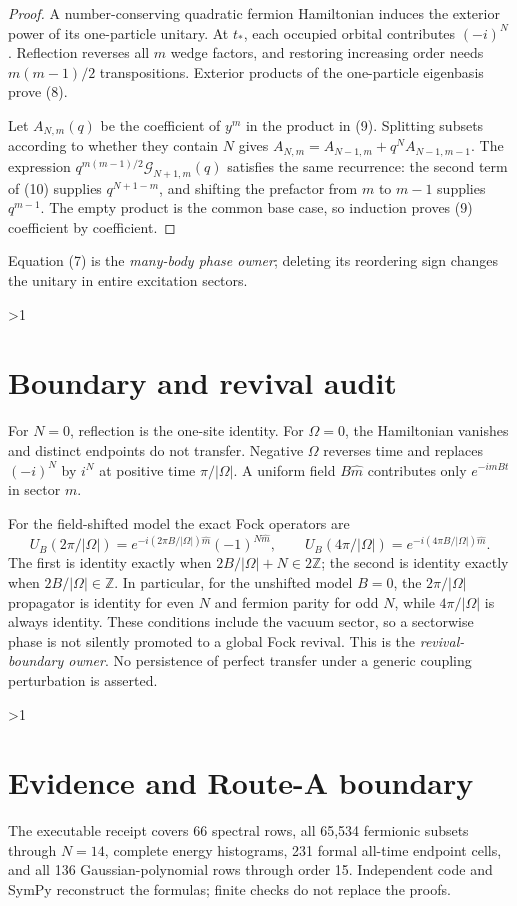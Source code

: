 \documentclass[10pt]{article}
\providecommand{\CRevisionRound}{2}
\begin{document}
\begin{proof}
A number-conserving quadratic fermion Hamiltonian induces the exterior power
of its one-particle unitary.  At \(t_*\), each occupied orbital contributes
\((-i)^N\).  Reflection reverses all \(m\) wedge factors, and restoring
increasing order needs \(m(m-1)/2\) transpositions.  Exterior products of the
one-particle eigenbasis prove (8).

Let $A_{N,m}(q)$ be the coefficient of $y^m$ in the product in (9).
Splitting subsets according to whether they contain $N$ gives
$A_{N,m}=A_{N-1,m}+q^N A_{N-1,m-1}$.  The expression
$q^{m(m-1)/2}\mathcal G_{N+1,m}(q)$ satisfies the same recurrence:
the second term of (10) supplies $q^{N+1-m}$, and shifting the prefactor from
$m$ to $m-1$ supplies $q^{m-1}$.  The empty product is the common base case,
so induction proves (9) coefficient by coefficient.
\end{proof}
Equation (7) is the \emph{many-body phase owner}; deleting its reordering sign
changes the unitary in entire excitation sectors.
\fi

\ifnum\CRevisionRound>1
\section{Boundary and revival audit}
For \(N=0\), reflection is the one-site identity.  For \(\Omega=0\), the
Hamiltonian vanishes and distinct endpoints do not transfer.  Negative
\(\Omega\) reverses time and replaces \((-i)^N\) by \(i^N\) at positive
time \(\pi/|\Omega|\).  A uniform field \(B\widehat m\) contributes only
\(e^{-imBt}\) in sector \(m\).

For the field-shifted model the exact Fock operators are
\[
 U_B(2\pi/|\Omega|)=
 e^{-i(2\pi B/|\Omega|)\widehat m}(-1)^{N\widehat m},\qquad
 U_B(4\pi/|\Omega|)=e^{-i(4\pi B/|\Omega|)\widehat m}.
\]
The first is identity exactly when $2B/|\Omega|+N\in2\mathbb Z$; the second
is identity exactly when $2B/|\Omega|\in\mathbb Z$.  In particular, for the
unshifted model $B=0$, the $2\pi/|\Omega|$ propagator is identity for even
$N$ and fermion parity for odd $N$, while $4\pi/|\Omega|$ is always identity.
These conditions include the vacuum sector, so a sectorwise phase is not
silently promoted to a global Fock revival.  This is the
\emph{revival-boundary owner}.  No persistence of perfect transfer under a
generic coupling perturbation is asserted.

\ifnum\CRevisionRound>1
\small
\fi
\section{Evidence and Route-A boundary}
The executable receipt covers 66 spectral rows, all 65,534 fermionic subsets
through \(N=14\), complete energy histograms, 231 formal all-time endpoint
cells, and all 136 Gaussian-polynomial rows through order 15.
Independent code and SymPy reconstruct the formulas; finite checks do not
replace the proofs.
\end{document}
